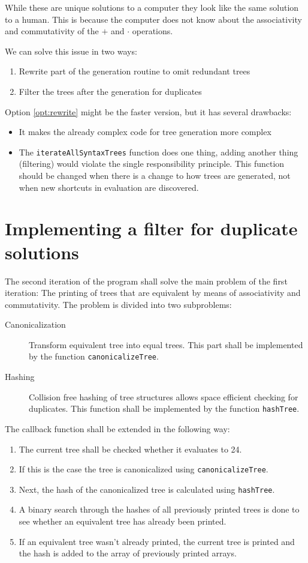 \documentclass[11pt,a4paper]{article}
\newcommand{\code}[1]{\texttt{#1}}
\begin{document}
While these are unique solutions to a computer they look like the same
solution to a human. This is because the computer does not know about
the associativity and commutativity of the $+$ and $\cdot$
operations.

We can solve this issue in two ways:
\begin{enumerate}
\item \label{opt:rewrite} Rewrite part of the generation routine to
  omit redundant trees
\item \label{opt:filter} Filter the trees after the generation for
  duplicates
\end{enumerate}

Option \ref{opt:rewrite} might be the faster version, but it has
several drawbacks:
\begin{itemize}
\item It makes the already complex code for tree generation more
  complex
\item The \code{iterateAllSyntaxTrees} function does one thing,
  adding another thing (filtering) would violate the single
  responsibility principle.
  This function should be changed when there is a change to how trees
  are generated, not when new shortcuts in evaluation are discovered.
\end{itemize}

\section{Implementing a filter for duplicate solutions}

The second iteration of the program shall solve the main problem of
the first iteration:
The printing of trees that are equivalent by means of associativity
and commutativity.
The problem is divided into two subproblems:
\begin{description}
\item[Canonicalization] Transform equivalent tree into equal trees.
  This part shall be implemented by the function
  \code{canonicalizeTree}.
\item[Hashing] Collision free hashing of tree structures allows space
  efficient checking for duplicates.
  This function shall be implemented by the function
  \code{hashTree}.
\end{description}

The callback function shall be extended in the following way:
\begin{enumerate}
\item The current tree shall be checked whether it evaluates to 24.
\item If this is the case the tree is canonicalized using
  \code{canonicalizeTree}.
\item Next, the hash of the canonicalized tree is calculated using
  \code{hashTree}.
\item A binary search through the hashes of all previously printed
  trees is done to see whether an equivalent tree has already been
  printed.
\item If an equivalent tree wasn't already printed, the current tree
  is printed and the hash is added to the array of previously printed
  arrays.
\end{enumerate}
\end{document}
